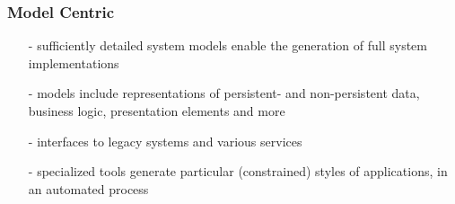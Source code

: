 %
%
%
%
%
%
%

\subsubsection{Model Centric}
\label{model_centric_heading}

\begin{itemize}
    \item[-] sufficiently detailed system models enable the generation of full
        system implementations
    \item[-] models include representations of persistent- and non-persistent
        data, business logic, presentation elements and more
    \item[-] interfaces to legacy systems and various services
    \item[-] specialized tools generate particular (constrained) styles of
        applications, in an automated process
\end{itemize}
